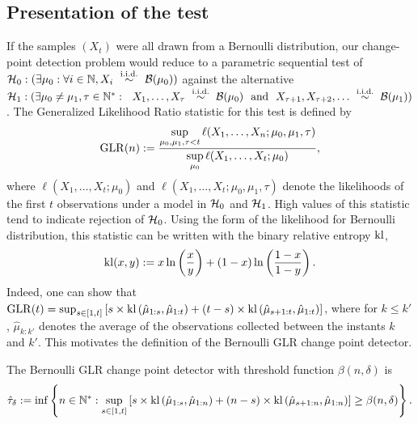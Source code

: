 \subsection{Presentation of the test}

If the samples $(X_t)$ were all drawn from a Bernoulli distribution, our change-point detection problem would reduce to a parametric sequential test of
$\cH_0 : (\exists \mu_0: \forall i\in\N, X_i \ \overset{\text{i.i.d.}}{\sim} \ \cB(\mu_0))$
against the alternative
$\cH_1 : (\exists \mu_0 \neq \mu_1, \tau \in \N^*: \ \  X_1, \ldots, X_\tau \ \overset{\text{i.i.d.}}{\sim} \ \cB(\mu_0) \ \ \text{and} \ \ X_{\tau+1}, X_{\tau+2}, \ldots \ \overset{\text{i.i.d.}}{\sim} \ \cB(\mu_1))$.
The Generalized Likelihood Ratio statistic for this test is defined by
\[\mathrm{GLR}(n) :=\frac{\sup\limits_{\mu_0,\mu_1,\tau < t}\ell(X_1, \ldots, X_n ; \mu_0,\mu_1,\tau)}{\sup\limits_{\mu_0}\ell(X_1, \ldots, X_t ; \mu_0)},\]
%
where $\ell(X_1, \ldots, X_t ; \mu_0)$ and $\ell(X_1, \ldots, X_t ; \mu_0,\mu_1,\tau)$ denote the likelihoods of the first $t$ observations under a model in $\mathcal{H}_0$ and $\mathcal{H}_1$.
High values of this statistic tend to indicate rejection of $\mathcal{H}_0$.
Using the form of the likelihood for Bernoulli distribution, this statistic can be written with the binary relative entropy $\mathrm{kl}$,
%
\begin{equation}\label{eq:6:BernoulliDivergence}
    \mathrm{kl}(x,y) := x \ln\left(\frac{x}{y}\right) + (1-x)\ln\left(\frac{1-x}{1-y}\right).
\end{equation}
%
Indeed, one can show that $\mathrm{GLR}(t) = \sup_{s \in [1,t]} \left[s \times \mathrm{kl}\left(\hat{\mu}_{1:s},\hat{\mu}_{1:t}\right) + (t-s) \times \mathrm{kl}\left(\hat{\mu}_{s+1:t},\hat{\mu}_{1:t}\right)\right]$,
where for $k \leq k'$, $\hat{\mu}_{k:k'}$ denotes the average of the observations collected between the instants $k$ and $k'$. This motivates the definition of the Bernoulli GLR change point detector.

\begin{definition}\label{def:6:GLRDef}
    The Bernoulli GLR change point detector with threshold function $\beta(n,\delta)$ is
    \begin{equation}\label{def:6:GLR}
        \hat\tau_{\delta} := \inf \left\{ n \in \mathbb{N}^* : \sup_{s \in [1,t]} \left[s \times \mathrm{kl}\left(\hat{\mu}_{1:s},\hat{\mu}_{1:n}\right) + (n-s) \times \mathrm{kl}\left(\hat{\mu}_{s+1:n},\hat{\mu}_{1:n}\right)\right] \geq \beta(n,\delta)\right\}.
    \end{equation}
\end{definition}

